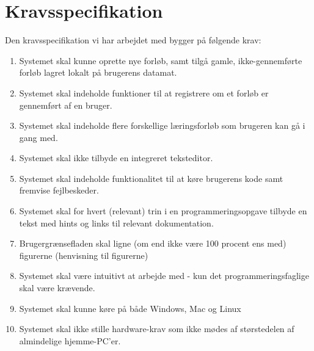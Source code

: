 \documentclass[10pt,a4paper,danish]{article}
\begin{document}
\section{Kravsspecifikation}
Den kravsspecifikation vi har arbejdet med bygger på følgende krav:

\begin{enumerate}
\item Systemet skal kunne oprette nye forløb, samt tilgå gamle, ikke-gennemførte forløb lagret lokalt på brugerens datamat. 
\item Systemet skal indeholde funktioner til at registrere om et forløb er gennemført af en bruger. 
\item Systemet skal indeholde flere forskellige læringsforløb som brugeren kan gå i gang med.  
\item Systemet skal ikke tilbyde en integreret teksteditor.
\item Systemet skal indeholde funktionalitet til at køre brugerens kode samt fremvise fejlbeskeder.
\item Systemet skal for hvert (relevant) trin i en programmeringsopgave tilbyde en tekst med hints og links til relevant dokumentation.
\item Brugergrænsefladen skal ligne (om end ikke være 100 procent ens med) figurerne (henvisning til figurerne)
\item Systemet skal være intuitivt at arbejde med - kun det programmeringsfaglige skal være krævende. 
\item Systemet skal kunne køre på både Windows, Mac og Linux
\item Systemet skal ikke stille hardware-krav som ikke mødes af størstedelen af almindelige hjemme-PC'er.
\end{enumerate}  
\end{document}
